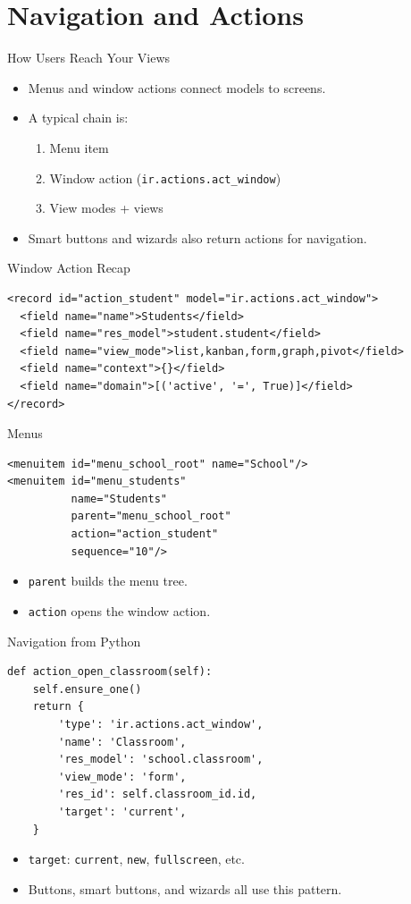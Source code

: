 \section{Navigation and Actions}

\begin{frame}{How Users Reach Your Views}
	\begin{itemize}
		\item Menus and window actions connect models to screens.
		\item A typical chain is:
		\begin{enumerate}
			\item Menu item
			\item Window action (\texttt{ir.actions.act\_window})
			\item View modes + views
		\end{enumerate}
		\item Smart buttons and wizards also return actions for navigation.
	\end{itemize}
\end{frame}

\begin{frame}[fragile]{Window Action Recap}
\begin{lstlisting}[style=xml]
<record id="action_student" model="ir.actions.act_window">
  <field name="name">Students</field>
  <field name="res_model">student.student</field>
  <field name="view_mode">list,kanban,form,graph,pivot</field>
  <field name="context">{}</field>
  <field name="domain">[('active', '=', True)]</field>
</record>
\end{lstlisting}
\end{frame}

\begin{frame}[fragile]{Menus}
\begin{lstlisting}[style=xml]
<menuitem id="menu_school_root" name="School"/>
<menuitem id="menu_students"
		  name="Students"
		  parent="menu_school_root"
		  action="action_student"
		  sequence="10"/>
\end{lstlisting}
	\begin{itemize}
		\item \texttt{parent} builds the menu tree.
		\item \texttt{action} opens the window action.
	\end{itemize}
\end{frame}

\begin{frame}[fragile]{Navigation from Python}
\begin{lstlisting}
def action_open_classroom(self):
	self.ensure_one()
	return {
		'type': 'ir.actions.act_window',
		'name': 'Classroom',
		'res_model': 'school.classroom',
		'view_mode': 'form',
		'res_id': self.classroom_id.id,
		'target': 'current',
	}
\end{lstlisting}
	\begin{itemize}
		\item \texttt{target}: \texttt{current}, \texttt{new}, \texttt{fullscreen}, etc.
		\item Buttons, smart buttons, and wizards all use this pattern.
	\end{itemize}
\end{frame}

